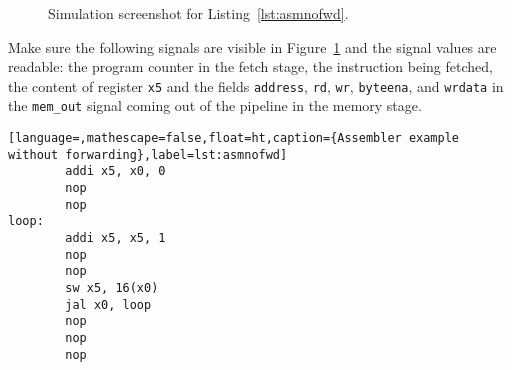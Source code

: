\documentclass[11pt,a4paper,titlepage,oneside]{article}
\begin{document}
\maketitle


\begin{figure}[ht!]
  \centering
  \caption{Simulation screenshot for Listing~\ref{lst:asmnofwd}.}
  \label{fig:sim}
\end{figure}

Make sure the following signals are visible in Figure~\ref{fig:sim} and the 
signal values are readable:
the program counter in the fetch stage, the instruction being fetched, the 
content of register \texttt{x5} and the fields \texttt{address}, \texttt{rd}, 
\texttt{wr}, \texttt{byteena}, and \texttt{wrdata} in the \texttt{mem\_out} 
signal coming out of the pipeline in the memory stage.

\begin{lstlisting}[language=,mathescape=false,float=ht,caption={Assembler example without forwarding},label=lst:asmnofwd]
        addi x5, x0, 0
        nop
        nop
loop:
        addi x5, x5, 1
        nop
        nop
        sw x5, 16(x0)
        jal x0, loop
        nop
        nop
        nop
\end{lstlisting}
\end{document}
